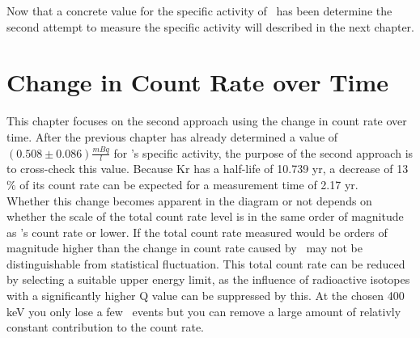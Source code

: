 \documentclass[encoding=utf8,british]{tumphthesis}
\begin{document}
Now that a concrete value for the specific activity of \Kr\ has been determine the second attempt to measure the specific activity will described in the next chapter.
\\  
\fi































\chapter{Change in Count Rate over Time}
\label{sec:SAfromDecrease}

This chapter focuses on the second approach using the change in count rate over time.
After the previous chapter has already determined a value of $(0.508\pm0.086)\frac{\unit{mBq}} {\unit{l}}$ for \Kr's specific activity, the purpose of the second approach is to cross-check this value.
Because Kr has a half-life of 10.739 yr, a decrease of 13 $ \% $ of its count rate can be expected for a measurement time of 2.17 yr.
\\

Whether this change becomes apparent in the diagram or not depends on whether the scale of the total count rate level is in the same order of magnitude as \Kr's count rate or lower.
If the total count rate measured would be orders of magnitude higher than the change in count rate caused by \Kr\ may not be distinguishable from statistical fluctuation.
This total count rate can be reduced by selecting a suitable upper energy limit, as the influence of radioactive isotopes with a significantly higher Q value can be suppressed by this.
At the chosen 400 keV you only lose a few \Kr\ events but you can remove a large amount of relativly constant contribution to the count rate.
\\
\end{document}

